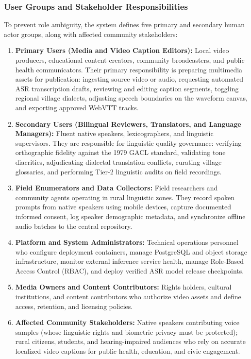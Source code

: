\documentclass[conference]{IEEEtran}
\begin{document}
\subsubsection{User Groups and Stakeholder Responsibilities}
\label{sec:design:ucd:users}
To prevent role ambiguity, the system defines five primary and secondary human actor groups, along with affected community stakeholders:
\begin{enumerate}
    \item \textbf{Primary Users (Media and Video Caption Editors):} Local video producers, educational content creators, community broadcasters, and public health communicators. Their primary responsibility is preparing multimedia assets for publication: ingesting source video or audio, requesting automated ASR transcription drafts, reviewing and editing caption segments, toggling regional village dialects, adjusting speech boundaries on the waveform canvas, and exporting approved WebVTT tracks.
    \item \textbf{Secondary Users (Bilingual Reviewers, Translators, and Language Managers):} Fluent native speakers, lexicographers, and linguistic supervisors. They are responsible for linguistic quality governance: verifying orthographic fidelity against the 1979 GACL standard, validating tone diacritics, adjudicating dialectal translation conflicts, curating village glossaries, and performing Tier-2 linguistic audits on field recordings.
    \item \textbf{Field Enumerators and Data Collectors:} Field researchers and community agents operating in rural linguistic zones. They record spoken prompts from native speakers using mobile devices, capture documented informed consent, log speaker demographic metadata, and synchronize offline audio batches to the central repository.
    \item \textbf{Platform and System Administrators:} Technical operations personnel who configure deployment containers, manage PostgreSQL and object storage infrastructure, monitor external inference service health, manage Role-Based Access Control (RBAC), and deploy verified ASR model release checkpoints.
    \item \textbf{Media Owners and Content Contributors:} Rights holders, cultural institutions, and content contributors who authorize video assets and define access, retention, and licensing policies.
    \item \textbf{Affected Community Stakeholders:} Native speakers contributing voice samples (whose linguistic rights and biometric privacy must be protected); rural citizens, students, and hearing-impaired audiences who rely on accurate localized video captions for public health, education, and civic engagement.
\end{enumerate}
\end{document}
